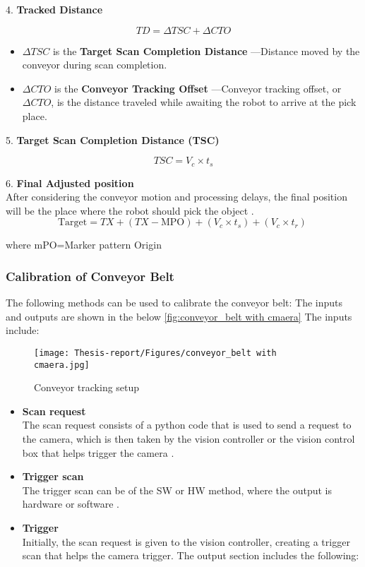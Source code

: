 \documentclass[12pt]{article}
\begin{document}
4. \textbf{Tracked Distance} 

\[
TD = \Delta TSC + \Delta CTO 
\]

\begin{itemize}
  \item $\Delta TSC$ is the \textbf{Target Scan Completion Distance}%
        —Distance moved by the conveyor during scan completion\cite{ref21}.
  \item $\Delta CTO$ is the \textbf{Conveyor Tracking Offset}%
        —Conveyor tracking offset, or $\Delta CTO$, is the distance traveled while awaiting the robot to arrive at the pick place\cite{ref21}.
\end{itemize}

5. \textbf{Target Scan Completion Distance (TSC)} 

\begin{center}
    \[
    TSC = V_c \times t_s 
    \]
\end{center}

6. \textbf{Final Adjusted position}\\

After considering the conveyor motion and processing delays, the final position will be the place where the robot should pick the object \cite{ref21}.\\

\[
\text{Target} = TX + (TX - \text{MPO}) + (V_c \times t_s) + (V_c \times t_r)\
\]

where mPO=Marker pattern Origin
\subsubsection{Calibration of Conveyor Belt}
The following methods can be used to calibrate the conveyor belt:  The inputs and outputs are shown in the below \autoref{fig:conveyor_belt with cmaera} The inputs include:\\

\begin{figure}[h]
    \centering
    \texttt{[image: Thesis-report/Figures/conveyor\_belt with cmaera.jpg]} 
    \caption{Conveyor tracking setup}
    \label{fig:conveyor_belt with cmaera}
\end{figure}

\begin{itemize}
\item \textbf{Scan request}\\
The scan request consists of a  python code that is used to send a request to the camera, which is then taken by the vision controller or the vision control box that helps trigger the camera \cite{ref21}.
 \item \textbf{Trigger scan}\\
 The trigger scan can be of the SW or HW method, where the output is hardware or software \cite{ref21}.

\item \textbf{Trigger }\\
Initially, the scan request is given to the vision controller, creating a trigger scan that helps the camera trigger\cite{ref21}.
The output section includes the following:
\end{itemize}
\end{document}
